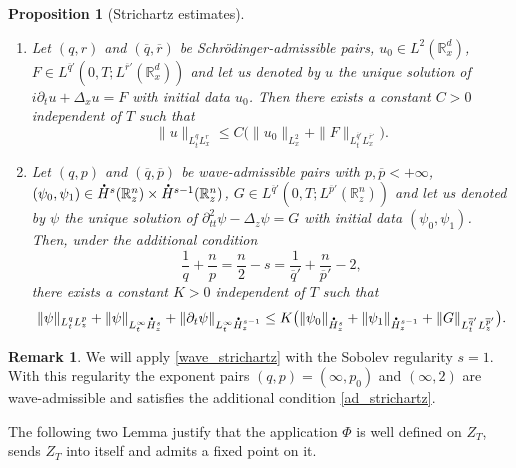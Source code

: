 \documentclass[10pt]{amsart}
\newenvironment{enumeratei}
{\bgroup\def\theenumi{\roman{enumi}}\def\theenumii{\arabic{enumii}}\begin{enumerate}}
{\end{enumerate}\egroup}
\let\bar\oldbar
\newtheorem{proposition}[lemma]{Proposition}
\theoremstyle{definition}
\newtheorem{rmk}[lemma]{Remark}
\newcommand*{\overbigdot}[1]{%
\accentset{\mbox{\large\bfseries .}}{#1}}
\let\bar\overline
\newcommand{\R}{\mathbb{R}}
\begin{document}
\skpt
\begin{proposition}[Strichartz estimates]\label{strichartz}
\begin{enumeratei}
\item
Let $(q,r)$ and $(\bar{q},\bar{r})$ be Schrödinger-admissible pairs, $u_{0}\in L^{2}(\R_{x}^{d})$, $F\in L^{\bar{q}'}(0,T;L^{\bar{r}'}(\R_{x}^{d}))$ and let us denoted by $u$ the unique solution of $i\partial_{t}u+\Delta_{x}u=F$ with initial data $u_{0}$. Then there exists a constant $C>0$ independent of $T$ such that
\begin{equation}\label{schro_strichartz}
\|u\|_{L_{t}^{q}L_{x}^{r}}\leq C\bigl(\|u_{0}\|_{L_{x}^{2}}+\|F\|_{L_{t}^{\bar{q}'}L_{x}^{\bar{r}'}}\bigr).
\end{equation}

\item
Let $(q,p)$ and $(\bar{q},\bar{p})$ be wave-admissible pairs with $p,\bar{p}<+\infty$, $(\psi_{0},\psi_{1})\in\overbigdot{H}^{s}(\R_{z}^{n})\times\overbigdot{H}^{s-1}(\R_{z}^{n})$, $G\in L^{\bar{q}'}(0,T;L^{\bar{p}'}(\R_{z}^{n}))$ and let us denoted by $\psi$ the unique solution of $\partial_{tt}^{2}\psi-\Delta_{z}\psi=G$ with initial data $(\psi_{0},\psi_{1})$. Then, under the additional condition
\begin{equation}\label{ad_strichartz}
\frac{1}{q}+\frac{n}{p}=\frac{n}{2}-s=\frac{1}{\bar{q}'}+\frac{n}{\bar{p}'}-2,
\end{equation}
there exists a constant $K>0$ independent of $T$ such that
\begin{equation}\label{wave_strichartz}
\|\psi\|_{L_{t}^{q}L_{z}^{p}}+\|\psi\|_{L_{t}^{\infty}\overbigdot{H}_{z}^{s}}+\|\partial_{t}\psi\|_{L_{t}^{\infty}\overbigdot{H}_{z}^{s-1}}\leq K\bigl(\|\psi_{0}\|_{\overbigdot{H}_{z}^{s}}+\|\psi_{1}\|_{\overbigdot{H}_{z}^{s-1}}+\|G\|_{L_{t}^{\bar{q}'}L_{z}^{\bar{p}'}}\bigr).
\end{equation}
\end{enumeratei}
\end{proposition}

\begin{rmk}
We will apply \eqref{wave_strichartz} with the Sobolev regularity $s=1$. With this regularity the exponent pairs $(q,p)=(\infty,p_{0})$ and $(\infty,2)$ are wave-admissible and satisfies the additional condition \eqref{ad_strichartz}.
\end{rmk}

The following two Lemma justify that the application $\Phi$ is well defined on $Z_{T}$, sends $Z_{T}$ into itself and admits a fixed point on it.
\end{document}
